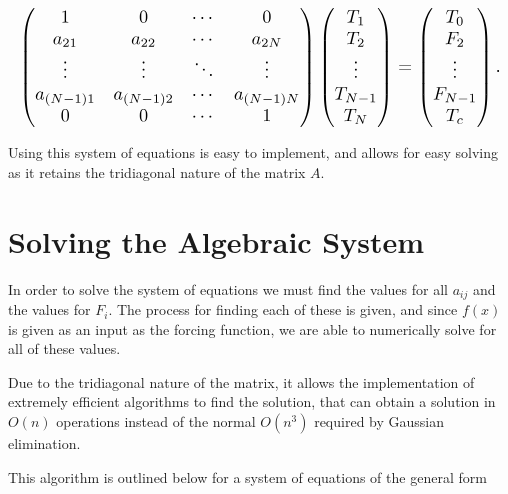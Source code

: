 \documentclass[10pt]{amsart}
\numberwithin{equation}{section}
\theoremstyle{definition}
\begin{document}
\begin{multicols}{2}
\begin{align*}
  \resizebox{\columnwidth}{!}{$
  \begin{pmatrix}
    1 & 0 & \cdots & 0\\
    a_{21} & a_{22} & \cdots & a_{2N}\\
    \vdots & \vdots & \ddots & \vdots \\
    a_{(N-1)1} & a_{(N-1)2} & \cdots & a_{(N-1)N}\\
    0 & 0 & \cdots & 1
  \end{pmatrix}
  \begin{pmatrix}
    T_1 \\ T_2 \\ \vdots \\ T_{N-1} \\ T_N
  \end{pmatrix}
  =
  \begin{pmatrix}
    T_0 \\ F_2 \\ \vdots \\ F_{N-1} \\ T_c
\end{pmatrix}.$}
\end{align*}

Using this system of equations is easy to implement, and allows for easy
solving as it retains the tridiagonal nature of the matrix $A$.

\section{Solving the Algebraic System}%
\label{sec:solving_the_algebraic_system}

In order to solve the system of equations we must find the values for all
$a_{ij}$ and the values for $F_{i}$. The process for finding each of these is
given, and since $f(x)$ is given as an input as the forcing function, we are
able to numerically solve for all of these values.

Due to the tridiagonal nature of the matrix, it allows the implementation of
extremely efficient algorithms to find the solution, that can obtain a solution
in $O(n)$ operations instead of the normal $O\left(n^3\right)$ required by
Gaussian elimination.

This algorithm is outlined below for a system of equations of the general form


\end{multicols}
\end{document}

